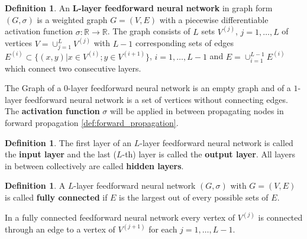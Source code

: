 \documentclass{article}
\theoremstyle{definition}
\newtheorem{definition}[theorem]{Definition}
\begin{document}
\begin{definition}
\label{def:graphFeedForwardNetwork}
An \textbf{L-layer feedforward neural network} in graph form $(G, \sigma)$ is a weighted graph $G=(V, E)$ with a piecewise differentiable activation function $\sigma: \mathbb{R} \to \mathbb{R}$. The graph consists of $L$ sets $V^{(j)}$, $j = 1, \dots , L$ of vertices $V=\cup_{j=1}^{L}V^{(j)}$ with $L-1$ corresponding sets of edges $E^{(i)} \subset \{(x,y)|x \in V^{(i)}; y \in V^{(i+1)}\}$, $i = 1, \dots , L-1$ and $E=\cup_{i=1}^{L-1}E^{(i)}$ which connect two consecutive layers.
\end{definition}

The Graph of a $0$-layer feedforward neural network is an empty graph and of a $1$-layer feedforward neural network is a set of vertices without connecting edges. The \textbf{activation function} $\sigma$ will be applied in between propagating nodes in forward propagation \ref{def:forward_propagation}.

\begin{definition}
The first layer of an $L$-layer feedforward neural network is called the \textbf{input layer} and the last ($L$-th) layer is called the \textbf{output layer}. All layers in between collectively are called \textbf{hidden layers}.
\end{definition}

\begin{definition}
A $L$-layer feedforward neural network $(G, \sigma)$ with $G = (V, E)$ is called \textbf{fully connected} if $E$ is the largest out of every possible sets of $E$.
\end{definition}

In a fully connected feedforward neural network every vertex of $V^{(j)}$ is connected through an edge to a vertex of $V^{(j+1)}$ for each $j = 1, \dots , L-1$.
\end{document}
